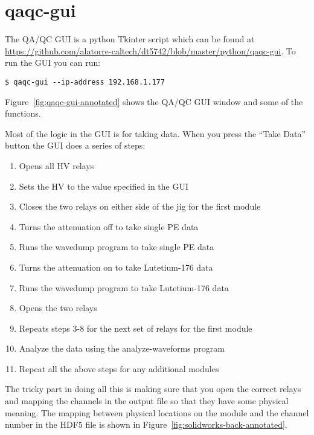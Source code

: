 \documentclass[12pt,openright,twoside]{report}
\begin{document}
\section{qaqc-gui}
\label{sec:qaqc-gui}
The QA/QC GUI is a python Tkinter script which can be found at
\url{https://github.com/alatorre-caltech/dt5742/blob/master/python/qaqc-gui}.
To run the GUI you can run:

\begin{mdframed}[backgroundcolor=light-gray, roundcorner=10pt,leftmargin=1, rightmargin=1, innerleftmargin=15, innertopmargin=15,innerbottommargin=15, outerlinewidth=1, linecolor=light-gray]
\begin{lstlisting}
$ qaqc-gui --ip-address 192.168.1.177
\end{lstlisting}
\end{mdframed}

Figure~\ref{fig:qaqc-gui-annotated} shows the QA/QC GUI window and some of the
functions.

Most of the logic in the GUI is for taking data. When you press the ``Take Data'' button the GUI does a series of steps:

\begin{enumerate}
\item Opens all HV relays
\item Sets the HV to the value specified in the GUI
\item Closes the two relays on either side of the jig for the first module
\item Turns the attenuation off to take single PE data
\item Runs the wavedump program to take single PE data
\item Turns the attenuation on to take Lutetium-176 data
\item Runs the wavedump program to take Lutetium-176 data
\item Opens the two relays
\item Repeats steps 3-8 for the next set of relays for the first module
\item Analyze the data using the analyze-waveforms program
\item Repeat all the above steps for any additional modules
\end{enumerate}

The tricky part in doing all this is making sure that you open the correct
relays and mapping the channels in the output file so that they have some
physical meaning. The mapping between physical locations on the module and the
channel number in the HDF5 file is shown in
Figure~\ref{fig:solidworks-back-annotated}.
\end{document}
